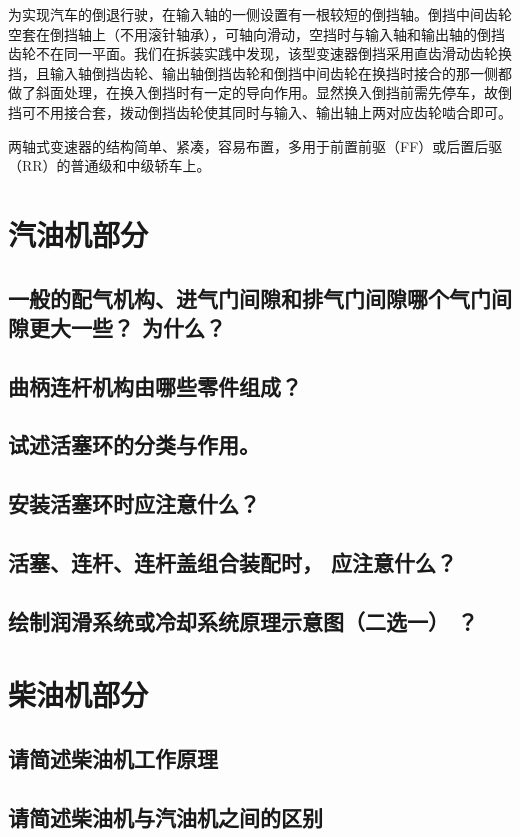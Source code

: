 \documentclass[UTF8]{ctexart}
\numberwithin{figure}{section}
\numberwithin{table}{section}
\begin{document}
为实现汽车的倒退行驶，在输入轴的一侧设置有一根较短的倒挡轴。倒挡中间齿轮空套在倒挡轴上（不用滚针轴承），可轴向滑动，空挡时与输入轴和输出轴的倒挡齿轮不在同一平面。我们在拆装实践中发现，该型变速器倒挡采用直齿滑动齿轮换挡，且输入轴倒挡齿轮、输出轴倒挡齿轮和倒挡中间齿轮在换挡时接合的那一侧都做了斜面处理，在换入倒挡时有一定的导向作用。显然换入倒挡前需先停车，故倒挡可不用接合套，拨动倒挡齿轮使其同时与输入、输出轴上两对应齿轮啮合即可。

两轴式变速器的结构简单、紧凑，容易布置，多用于前置前驱（FF）或后置后驱（RR）的普通级和中级轿车上。

\clearpage

\section{汽油机部分}
\subsection{一般的配气机构、进气门间隙和排气门间隙哪个气门间隙更大一些？ 为什么？}
\subsection{曲柄连杆机构由哪些零件组成？}
\subsection{试述活塞环的分类与作用。}
\subsection{安装活塞环时应注意什么？}
\subsection{活塞、连杆、连杆盖组合装配时， 应注意什么？}
\subsection{绘制润滑系统或冷却系统原理示意图（二选一） ？}
\clearpage

\section{柴油机部分}
\subsection{请简述柴油机工作原理}
\subsection{请简述柴油机与汽油机之间的区别}
\end{document}
